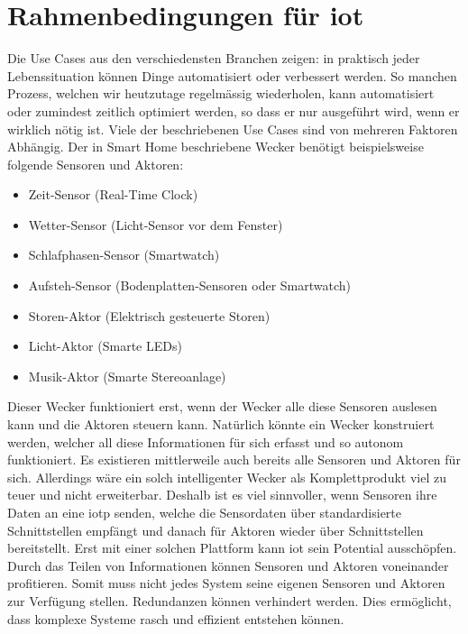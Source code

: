 \chapter{Rahmenbedingungen für \gls{iot}} \label{Rahmenbedingungen für iot}
Die Use Cases aus den verschiedensten Branchen zeigen: in praktisch jeder Lebenssituation können Dinge automatisiert oder verbessert werden. So manchen Prozess, welchen wir heutzutage regelmässig wiederholen, kann automatisiert oder zumindest zeitlich optimiert werden, so dass er nur ausgeführt wird, wenn er wirklich nötig ist. Viele der beschriebenen Use Cases sind von mehreren Faktoren Abhängig. Der in Smart Home beschriebene Wecker benötigt beispielsweise folgende Sensoren und Aktoren:
\begin{itemize}  
  \item Zeit-Sensor (Real-Time Clock)
  \item Wetter-Sensor (Licht-Sensor vor dem Fenster)
  \item Schlafphasen-Sensor (Smartwatch)
  \item Aufsteh-Sensor (Bodenplatten-Sensoren oder Smartwatch)
  \item Storen-Aktor (Elektrisch gesteuerte Storen)
  \item Licht-Aktor (Smarte LEDs)
  \item Musik-Aktor (Smarte Stereoanlage)
\end{itemize}
Dieser Wecker funktioniert erst, wenn der Wecker alle diese Sensoren auslesen kann und die Aktoren steuern kann. Natürlich könnte ein Wecker konstruiert werden, welcher all diese Informationen für sich erfasst und so autonom funktioniert. Es existieren mittlerweile auch bereits alle Sensoren und Aktoren für sich. Allerdings wäre ein solch intelligenter Wecker als Komplettprodukt viel zu teuer und nicht erweiterbar. Deshalb ist es viel sinnvoller, wenn Sensoren ihre Daten an eine \gls{iotp} senden, welche die Sensordaten über standardisierte Schnittstellen empfängt und danach für Aktoren wieder über Schnittstellen bereitstellt. Erst mit einer solchen Plattform kann \gls{iot} sein Potential ausschöpfen. Durch das Teilen von Informationen können Sensoren und Aktoren voneinander profitieren.
Somit muss nicht jedes System seine eigenen Sensoren und Aktoren zur Verfügung stellen. Redundanzen können verhindert werden. Dies ermöglicht, dass komplexe Systeme rasch und effizient entstehen können.  

